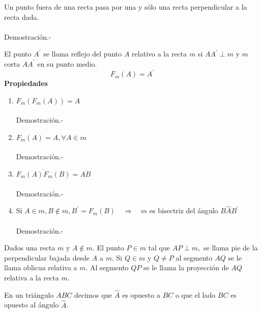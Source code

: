     \begin{proposicion}
	Un punto fuera de una recta pasa por una y sólo una recta perpendicular a la recta dada.\\\\
	    Demostración.-\;
    \end{proposicion}

\begin{tcolorbox}[colframe=white]
    \begin{def.}
	El punto $A^{'}$ se llama reflejo del punto $A$ relativo a la recta $m$ si $AA^{'} \perp m$ y $m$ corta $AA^{'}$ en su punto medio. $$F_{m}(A)=A^{'}$$
	\textbf{Propiedades}\\
	\begin{enumerate}[\bfseries i)]
	    \item $F_m (F_m(A))=A$\\\\
		Demostración.-\;
	    \item $F_m(A)=A, \forall A \in m$\\\\
		Demostración.-\;
	    \item $\overline{F_m(A) F_m(B)}=\overline{AB}$\\\\
		Demostración.-\;
	    \item Si $A\in m, B \notin m, B^{'}=F_m (B) \quad \Rightarrow \quad m$ es bisectriz del ángulo $B\widehat{A}B^{'}$\\\\
		Demostración.-\;
	\end{enumerate}
    \end{def.}
\end{tcolorbox}

\begin{tcolorbox}[colframe=white]
    \begin{def.}
	Dados una recta $m$ y $A\notin m$. El punto $P \in m$ tal que $AP \perp m,$ se llama pie de la perpendicular bajada desde $A$ a $m$. Si $Q \in m$ y $Q\neq P$ al segmento $AQ$ se le llama oblicua relativa a $m$. Al segmento $QP$ se le llama la proyección de $AQ$ relativa a la recta $m$.
    \end{def.}
\end{tcolorbox}

\begin{tcolorbox}[colframe=white]
    \begin{def.}
	En un triángulo $ABC$ decimos que $\widehat{A}$ es opuesto a $BC$ o que el lado $BC$ es opuesto al ángulo $\widehat{A}$.
    \end{def.}
\end{tcolorbox}

